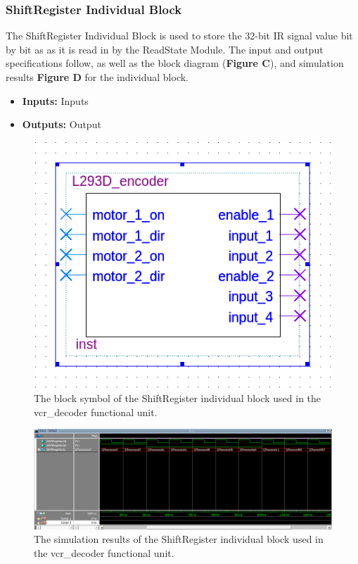 \documentclass[a4paper]{article}
\begin{document}
\clearpage



\subsubsection{ShiftRegister Individual Block}
The ShiftRegister Individual Block is used to store the 32-bit IR signal value bit by bit as as it is read in by the ReadState Module. The input and output specifications follow, as well as the block diagram (\textbf{Figure C}), and simulation results \textbf{Figure D} for the individual block.
\begin{itemize}
  \item \textbf{Inputs:  } Inputs
  \item \textbf{Outputs: } Output
\end{itemize}
\begin{figure}[h]
  \centering
  \includegraphics[width=.48\textwidth]{symbols/individual_placeholder.png}
  \caption{The block symbol of the ShiftRegister individual block used in the vcr\_decoder functional unit.}
    \label{fig:individual-1-2-block}
\end{figure}
\begin{figure}[h]
  \centering
  \includegraphics[width=.98\textwidth]{sims/vcr_testing/moduleTests/ShiftRegister/ShiftRegisterTest.png}
  \caption{The simulation results of the ShiftRegister individual block used in the vcr\_decoder functional unit.}
    \label{fig:individual-1-2-sim}
\end{figure}
\end{document}
